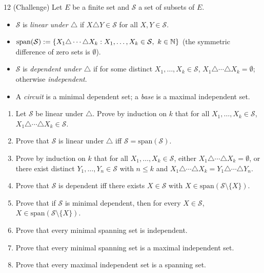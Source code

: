 \begin{exercise}{12}
    (Challenge) Let $E$ be a finite set and $\mathcal S$ a set of subsets of $E$.
    \begin{itemize}
        \item $\mathcal S$ is \emph{linear under $\triangle$} if
              $X\triangle Y\in\mathcal S$ for all $X,Y\in\mathcal S$.
        \item $\mathrm{span}(\mathcal S) := \{X_1\triangle\cdots\triangle X_k :
              X_1,\dots,X_k\in\mathcal S,\ k\in\mathbb{N}\}$ (the symmetric difference of
              zero sets is $\emptyset$).
        \item $\mathcal S$ is \emph{dependent under $\triangle$} if for some
              distinct $X_1,\dots,X_k\in\mathcal S$,
              $X_1\triangle\cdots\triangle X_k=\emptyset$; otherwise
              \emph{independent}.
        \item A \emph{circuit} is a minimal dependent set; a \emph{base} is a
              maximal independent set.
    \end{itemize}
    \begin{enumerate}[label=(\alph*)]
        \item Let $\mathcal S$ be linear under $\triangle$. Prove by induction on
              $k$ that for all $X_1,\dots,X_k\in\mathcal S$,
              $X_1\triangle\cdots\triangle X_k\in\mathcal S$.
        \item Prove that $\mathcal S$ is linear under $\triangle$ iff
              $\mathcal S=\mathrm{span}(\mathcal S)$.
        \item Prove by induction on $k$ that for all $X_1,\dots,X_k\in\mathcal
              S$, either $X_1\triangle\cdots\triangle X_k=\emptyset$, or there
              exist distinct $Y_1,\dots,Y_n\in\mathcal S$ with $n\le k$ and
              $X_1\triangle\cdots\triangle X_k=Y_1\triangle\cdots\triangle Y_n$.
        \item Prove that $\mathcal S$ is dependent iff there exists
              $X\in\mathcal S$ with $X\in\mathrm{span}(\mathcal S\setminus\{X\})$.
        \item Prove that if $\mathcal S$ is minimal dependent, then for every
              $X\in\mathcal S$, $X\in\mathrm{span}(\mathcal S\setminus\{X\})$.
        \item Prove that every minimal spanning set is independent.
        \item Prove that every minimal spanning set is a maximal independent set.
        \item Prove that every maximal independent set is a spanning set.

\end{enumerate}
\end{exercise}
